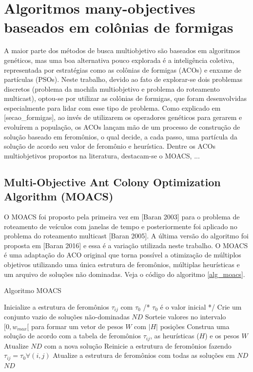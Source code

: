 \section{Algoritmos many-objectives baseados em colônias de formigas}

A maior parte dos métodos de busca multiobjetivo são baseados em algoritmos genéticos, mas uma boa alternativa pouco explorada é a inteligência coletiva, representada por estratégias como as colônias de formigas (ACOs) e enxame de partículas (PSOs). Neste trabalho, devido ao fato de explorar-se dois problemas discretos (problema da mochila multiobjetivo e problema do roteamento multicast), optou-se por utilizar as colônias de formigas, que foram desenvolvidas especialmente para lidar com esse tipo de problema. Como explicado em [secao\_formigas], ao invés de utilizarem os operadores genéticos para gerarem e evoluírem a população, os ACOs lançam mão de um processo de construção de solução baseado em feromônios, o qual decide, a cada passo, uma partícula da solução de acordo seu valor de feromônio e heurística. Dentre os ACOs multiobjetivos propostos na literatura, destacam-se o MOACS, ...

\subsection{Multi-Objective Ant Colony Optimization Algorithm (MOACS)}

O MOACS foi proposto pela primeira vez em [Baran 2003] para o problema de roteamento de veículos com janelas de tempo e posteriormente foi aplicado no problema do roteamento multicast [Baran 2005]. A última versão do algoritmo foi proposta em [Baran 2016] e essa é a variação utilizada neste trabalho. O MOACS é uma adaptação do ACO original que torna possível a otimização de múltiplos objetivos utilizando uma única estrutura de feromônios, múltiplas heurísticas e um arquivo de soluções não dominadas. Veja o código do algoritmo \ref{alg_moacs}.

\begin{algorithm}
	\caption{Algoritmo MOACS}
	\label{alg_moacs}
	\begin{algorithmic}[1]
		\State Inicialize a estrutura de feromônios $\tau_{ij}$ com $\tau_0$ /* $\tau_{0}$ é o valor inicial */
		\State Crie um conjunto vazio de soluções não-dominadas $ND$
		\State Sorteie valores no intervalo $[0, w_{max}[$ para formar um vetor de pesos $W$ com $|H|$ posições
		\State Construa uma solução de acordo com a tabela de feromônios $\tau_{ij}$, as heurísticas ($H$) e os pesos $W$
		\State Atualize $ND$ com a nova solução
		\EndFor
		\State Reinicie a estrutura de feromônios fazendo $\tau_{ij} = \tau_0 \forall(i,j)$
		\Else
		\State Atualize a estrutura de feromônios com todas as soluções em $ND$
		\EndIf
		\EndWhile
		\State \Return $ND$
	\end{algorithmic}
\end{algorithm}


